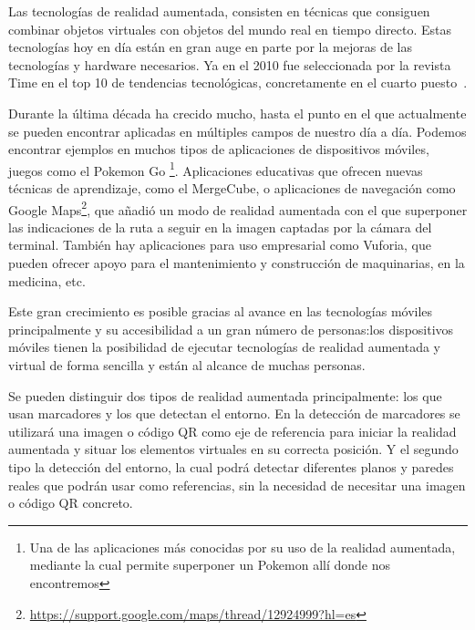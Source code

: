 
Las tecnologías de realidad aumentada, consisten en técnicas que consiguen combinar objetos virtuales con objetos del mundo real en tiempo directo. 
Estas tecnologías hoy en día están en gran auge en parte por la mejoras de las tecnologías y hardware necesarios. Ya en el 2010 fue seleccionada por la revista Time en el top 10 de tendencias tecnológicas, concretamente en el cuarto puesto~\cite{fletcher_2010}. 

Durante la última década ha crecido mucho, hasta el punto en el que actualmente se pueden encontrar aplicadas en múltiples campos de nuestro día a día. Podemos encontrar ejemplos en muchos tipos de aplicaciones de dispositivos móviles, juegos como el Pokemon Go \footnote{Una de las aplicaciones más conocidas por su uso de la realidad aumentada, mediante la cual permite superponer un Pokemon allí donde nos encontremos}. Aplicaciones educativas que ofrecen nuevas técnicas de aprendizaje, como el MergeCube, o aplicaciones de navegación como Google Maps\footnote{\url{https://support.google.com/maps/thread/12924999?hl=es}}, que añadió un modo de realidad aumentada con el que superponer las indicaciones de la ruta a seguir en la imagen captadas por la cámara del terminal. También hay aplicaciones para uso empresarial como Vuforia, que pueden ofrecer apoyo para el mantenimiento y construcción de maquinarias, en la medicina, etc.


Este gran crecimiento es posible gracias al avance en las tecnologías móviles principalmente y su accesibilidad a un gran número de personas:los dispositivos móviles tienen la posibilidad de ejecutar tecnologías de realidad aumentada y virtual de forma sencilla y están al alcance de muchas personas.

Se pueden distinguir dos tipos de realidad aumentada principalmente: los que usan marcadores y los que detectan el entorno. En la detección de marcadores se utilizará una imagen o código QR como eje de referencia para iniciar la realidad aumentada y situar los elementos virtuales en su correcta posición. 
Y el segundo tipo la detección del entorno, la cual podrá detectar diferentes planos y paredes reales que podrán usar como referencias, sin la necesidad de necesitar una imagen o código QR concreto.



